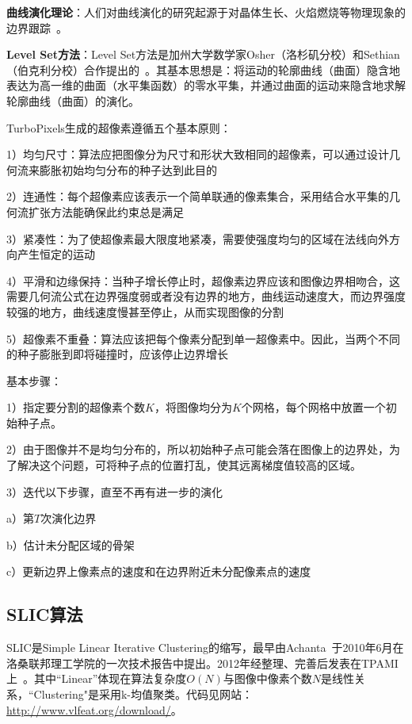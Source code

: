 \documentclass[12pt]{article}
\begin{document}
\textbf{曲线演化理论}：人们对曲线演化的研究起源于对晶体生长、火焰燃烧等物理现象的边界跟踪~\cite{sethian1985curvature}。

\textbf{Level Set方法}：Level Set方法是加州大学数学家Osher（洛杉矶分校）和Sethian（伯克利分校）合作提出的~\cite{osher1988fronts}。其基本思想是：将运动的轮廓曲线（曲面）隐含地表达为高一维的曲面（水平集函数）的零水平集，并通过曲面的运动来隐含地求解轮廓曲线（曲面）的演化。

TurboPixels生成的超像素遵循五个基本原则：

1）均匀尺寸：算法应把图像分为尺寸和形状大致相同的超像素，可以通过设计几何流来膨胀初始均匀分布的种子达到此目的

2）连通性：每个超像素应该表示一个简单联通的像素集合，采用结合水平集的几何流扩张方法能确保此约束总是满足

3）紧凑性：为了使超像素最大限度地紧凑，需要使强度均匀的区域在法线向外方向产生恒定的运动

4）平滑和边缘保持：当种子增长停止时，超像素边界应该和图像边界相吻合，这需要几何流公式在边界强度弱或者没有边界的地方，曲线运动速度大，而边界强度较强的地方，曲线速度慢甚至停止，从而实现图像的分割

5）超像素不重叠：算法应该把每个像素分配到单一超像素中。因此，当两个不同的种子膨胀到即将碰撞时，应该停止边界增长

基本步骤：

1）指定要分割的超像素个数$K$，将图像均分为$K$个网格，每个网格中放置一个初始种子点。

2）由于图像并不是均匀分布的，所以初始种子点可能会落在图像上的边界处，为了解决这个问题，可将种子点的位置打乱，使其远离梯度值较高的区域。

3）迭代以下步骤，直至不再有进一步的演化
 
a）第$T$次演化边界

b）估计未分配区域的骨架

c）更新边界上像素点的速度和在边界附近未分配像素点的速度

\subsection{SLIC算法}

SLIC是Simple Linear Iterative Clustering的缩写，最早由Achanta~\cite{achanta2010slic}于2010年6月在洛桑联邦理工学院的一次技术报告中提出。2012年经整理、完善后发表在TPAMI上~\cite{achanta2012slic}。其中“Linear”体现在算法复杂度$O(N)$与图像中像素个数$N$是线性关系，“Clustering"是采用k-均值聚类。代码见网站：\url{http://www.vlfeat.org/download/}。
\end{document}
